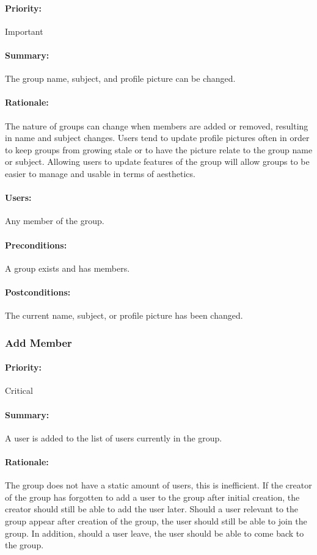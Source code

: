 \documentclass[11pt]{article}
\begin{document}
\paragraph{Priority:} Important
\paragraph{Summary:}
The group name, subject, and profile picture can be changed.
\paragraph{Rationale:}
The nature of groups can change when members are added or removed, resulting in name and subject changes. Users tend to update profile pictures often in order to keep groups from growing stale or to have the picture relate to the group name or subject. Allowing users to update features of the group will allow groups to be easier to manage and usable in terms of aesthetics.
\paragraph{Users:}
Any member of the group.
\paragraph{Preconditions:}
A group exists and has members.
\paragraph{{Postconditions:}}
The current name, subject, or profile picture has been changed.

\subsubsection{Add Member} \label{UC-add-member}
\paragraph{Priority:} Critical
\paragraph{Summary:}
A user is added to the list of users currently in the group.
\paragraph{Rationale:}
The group does not have a static amount of users, this is inefficient. If the creator of the group has forgotten to add a user to the group after initial creation, the creator should still be able to add the user later. Should a user relevant to the group appear after creation of the group, the user should still be able to join the group. In addition, should a user leave, the user should be able to come back to the group.
\end{document}
